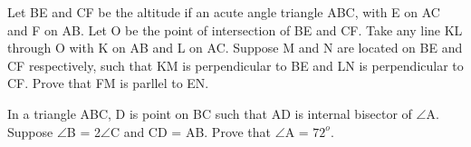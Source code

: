 \item Let BE and CF be the altitude if an acute angle triangle ABC, with E on AC and F on AB. Let O be the point of intersection of BE and CF. Take any line KL through O with K on AB and L on AC. Suppose M and N are located on BE and CF respectively, such that KM is perpendicular to BE and LN is perpendicular to CF. Prove that FM is parllel to EN.

\item In a triangle ABC, D is point on BC such that AD is internal bisector of $\angle$A. Suppose $\angle$B = 2$\angle$C and CD = AB. Prove that $\angle$A = $72^{o}$.

